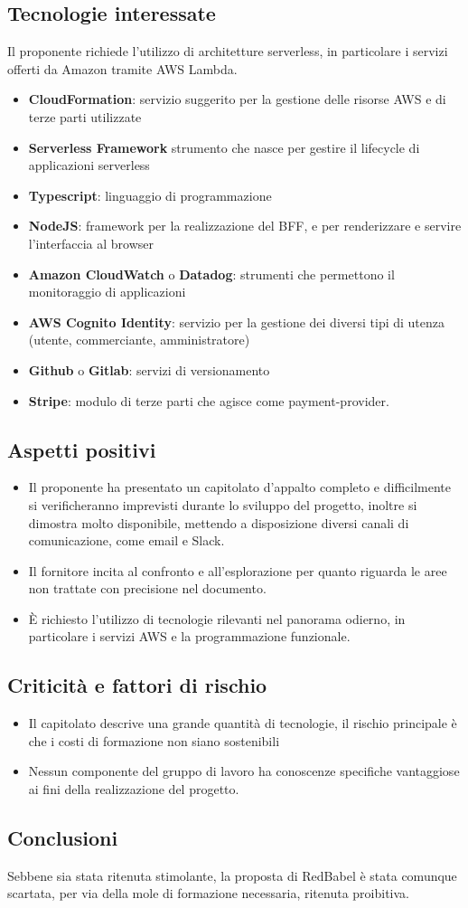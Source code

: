 \subsection{Tecnologie interessate}
Il proponente richiede l'utilizzo di architetture serverless, in particolare i servizi offerti da Amazon tramite AWS Lambda.
\begin{itemize}
	\item \textbf{CloudFormation}: servizio suggerito per la gestione delle risorse AWS e di terze parti utilizzate
    \item \textbf{Serverless Framework} strumento che nasce per gestire il lifecycle di applicazioni serverless
	\item \textbf{Typescript}: linguaggio di programmazione
	\item \textbf{NodeJS}: framework per la realizzazione del BFF, e per renderizzare e servire l'interfaccia al browser
	\item\textbf{Amazon CloudWatch} o \textbf{Datadog}: strumenti che permettono il monitoraggio di applicazioni
	\item \textbf{AWS Cognito Identity}: servizio per la gestione dei diversi tipi di utenza (utente, commerciante, amministratore)
	\item \textbf{Github} o \textbf{Gitlab}: servizi di versionamento
	\item \textbf{Stripe}: modulo di terze parti che agisce come payment-provider.
\end{itemize}
\subsection{Aspetti positivi}
\begin{itemize}
    \item Il proponente ha presentato un capitolato d'appalto completo e difficilmente si verificheranno imprevisti durante lo sviluppo del progetto, inoltre si dimostra molto disponibile, mettendo a disposizione diversi canali di comunicazione, come email e Slack.
    \item Il fornitore incita al confronto e all'esplorazione per quanto riguarda le aree non trattate con precisione nel documento.
    \item È richiesto l'utilizzo di tecnologie rilevanti nel panorama odierno, in particolare i servizi AWS e la programmazione funzionale.
\end{itemize}
\subsection{Criticità e fattori di rischio}
\begin{itemize}
    \item Il capitolato descrive una grande quantità di tecnologie, il rischio principale è che i costi di formazione non siano sostenibili
    \item Nessun componente del gruppo di lavoro ha conoscenze specifiche vantaggiose ai fini della realizzazione del progetto.
\end{itemize}
\subsection{Conclusioni}
Sebbene sia stata ritenuta stimolante, la proposta di RedBabel è stata comunque scartata, per via della mole di formazione necessaria, ritenuta proibitiva.
